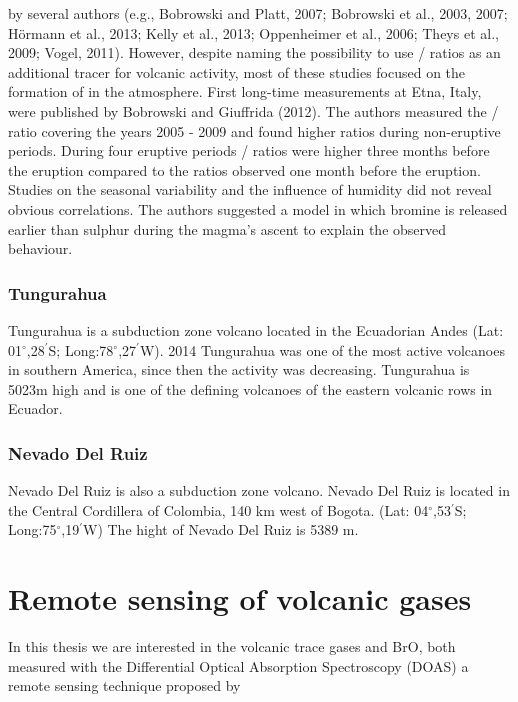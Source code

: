 \documentclass  [
  paper    = a4,
  BCOR     = 10mm,
  twoside,
  fontsize = 12pt,
  fleqn,
  toc      = bibnumbered,
  toc      = listofnumbered,
  numbers  = noendperiod,
  headings = normal,
  listof   = leveldown,
  version  = 3.03
]                                       {scrreprt}
\begin{document}
{	by several authors (e.g., Bobrowski and Platt, 2007; Bobrowski et al.,
	2003, 2007; Hörmann et al., 2013; Kelly et al., 2013; Oppenheimer et al., 2006;
	Theys et al., 2009; Vogel, 2011). However, despite naming the possibility to
	use / ratios as an additional tracer for volcanic activity, most of these
	studies focused on the formation of  in the atmosphere. First long-time
	measurements at Etna, Italy, were published by Bobrowski and Giuffrida (2012).
	The authors measured the / ratio covering the years 2005 - 2009 and
	found higher ratios during non-eruptive periods. During four eruptive periods
	/ ratios were higher three months before the eruption compared to the
	ratios observed one month before the eruption. Studies on the seasonal variability
	and the influence of humidity did not reveal obvious correlations. The authors
	suggested a model in which bromine is released earlier than sulphur during the
	magma’s ascent to explain the observed behaviour.}
	\subsection*{Tungurahua}
	Tungurahua is a subduction zone volcano located in the Ecuadorian Andes (Lat: 01$^{\circ}$,28$^{'}$S; Long:78$^{\circ}$,27$^{'}$W). 2014 Tungurahua was one of the most active volcanoes in southern America, since then the activity was decreasing. Tungurahua is 5023m high and is one of the defining volcanoes of the eastern volcanic rows in Ecuador. \cite{hall1999tungurahua}
		
	\subsection*{Nevado Del Ruiz}
	Nevado Del Ruiz is also a subduction zone volcano. 	Nevado Del Ruiz  is located in the Central Cordillera of Colombia, 140 km west of Bogota.
	(Lat: 04$^{\circ}$,53$^{'}$S; Long:75$^{\circ}$,19$^{'}$W) 
	The hight of Nevado Del Ruiz is 5389 m.
	 
	\chapter{Remote sensing of volcanic gases}
	In this thesis we are interested in the volcanic trace gases  and BrO, both measured with the Differential Optical Absorption Spectroscopy (DOAS) a remote sensing technique proposed by \cite{platt2008differential}\\
	
\end{document}
